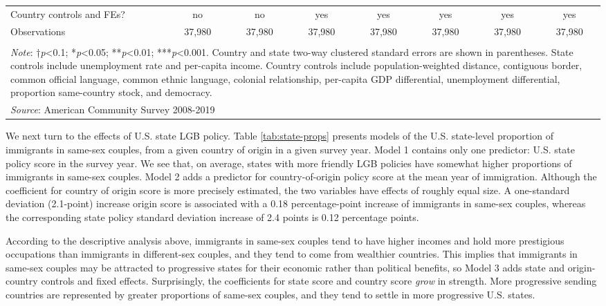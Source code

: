 \documentclass[
  12pt,
]{article}
\begin{document}
\begin{table}[!htbp]
\begin{tabular}{@{\extracolsep{5pt}}lccccccc}
Country controls and FEs? & no & no & yes & yes & yes & yes & yes \\ 
Observations & 37,980 & 37,980 & 37,980 & 37,980 & 37,980 & 37,980 & 37,980 \\ 
\hline 
\hline \\[-1.8ex] 
\multicolumn{8}{l}{\parbox[t]{\textwidth}{\textit{Note}: †\textit{p}<0.1; *\textit{p}<0.05; **\textit{p}<0.01; ***\textit{p}<0.001. Country and state two-way clustered standard errors are shown in parentheses. State controls include unemployment rate and per-capita income. Country controls include population-weighted distance, contiguous border, common official language, common ethnic language, colonial relationship, per-capita GDP differential, unemployment differential, proportion same-country stock, and democracy.}} \\ 
\multicolumn{8}{l}{\textit{Source}: American Community Survey 2008-2019} \\ 
\end{tabular} 
\end{table}

We next turn to the effects of U.S. state LGB policy. Table \ref{tab:state-props} presents models of the U.S. state-level proportion of immigrants in same-sex couples, from a given country of origin in a given survey year. Model 1 contains only one predictor: U.S. state policy score in the survey year. We see that, on average, states with more friendly LGB policies have somewhat higher proportions of immigrants in same-sex couples. Model 2 adds a predictor for country-of-origin policy score at the mean year of immigration. Although the coefficient for country of origin score is more precisely estimated, the two variables have effects of roughly equal size. A one-standard deviation (2.1-point) increase origin score is associated with a 0.18 percentage-point increase of immigrants in same-sex couples, whereas the corresponding state policy standard deviation increase of 2.4 points is 0.12 percentage points.

According to the descriptive analysis above, immigrants in same-sex couples tend to have higher incomes and hold more prestigious occupations than immigrants in different-sex couples, and they tend to come from wealthier countries. This implies that immigrants in same-sex couples may be attracted to progressive states for their economic rather than political benefits, so Model 3 adds state and origin-country controls and fixed effects. Surprisingly, the coefficients for state score and country score \emph{grow} in strength. More progressive sending countries are represented by greater proportions of same-sex couples, and they tend to settle in more progressive U.S. states.
\end{document}
